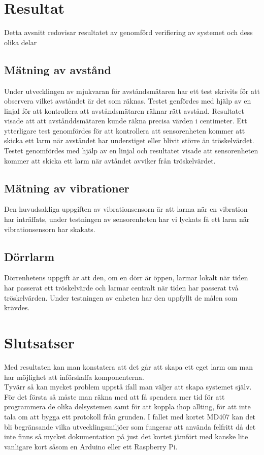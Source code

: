 \documentclass{article}
\begin{document}
\section{Resultat}
Detta avsnitt redovisar resultatet av genomförd verifiering av systemet och dess olika delar

\subsection{Mätning av avstånd}
Under utvecklingen av mjukvaran för avståndsmätaren har ett test skrivits för att observera vilket avståndet är det som räknas. Testet genfördes med hjälp av en linjal för att kontrollera att avståndsmätaren räknar rätt avstånd. Resultatet visade att att avstånddsmätaren kunde räkna precisa värden i centimeter. Ett ytterligare test genomfördes för att kontrollera att sensorenheten kommer att skicka ett larm när avståndet har understiget eller blivit större än tröskelvärdet. Testet genomfördes med hjälp av en linjal och resultatet visade att sensorenheten kommer att skicka ett larm när avtåndet avviker från tröskelvärdet. 

\subsection{Mätning av vibrationer}
Den huvudsakliga uppgiften av vibrationsensorn är att larma när en vibration har inträffats, under testningen av sensorenheten har vi lyckats få ett larm när vibrationsensorn har skakats.


\subsection{Dörrlarm}
Dörrenhetens uppgift är att den, om en dörr är öppen, larmar lokalt när tiden har passerat ett tröskelvärde och larmar centralt när tiden har passerat två tröskelvärden. Under testningen av enheten har den uppfyllt de målen som krävdes.


\section{Slutsatser}
Med resultaten kan man konstatera att det går att skapa ett eget larm om man har möjlighet att införskaffa komponenterna.\\

Tyvärr så kan mycket problem uppstå ifall man väljer att skapa systemet själv.
För det första så måste man räkna med att få spendera mer tid för att programmera de olika delsystemen samt för att koppla ihop allting, för att inte tala om att bygga ett protokoll från grunden.
I fallet med kortet MD407 kan det bli begränsande vilka utvecklingsmiljöer som fungerar att använda felfritt då det inte finns så mycket dokumentation på just det kortet jämfört med kanske lite vanligare kort såsom en Arduino eller ett Raspberry Pi.\\
\end{document}
